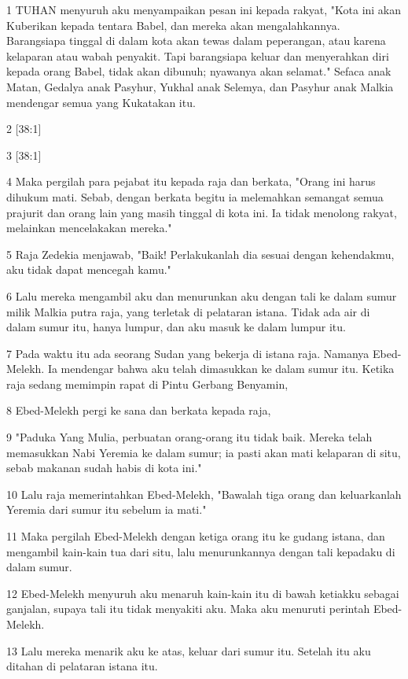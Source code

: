 \par 1 TUHAN menyuruh aku menyampaikan pesan ini kepada rakyat, "Kota ini akan Kuberikan kepada tentara Babel, dan mereka akan mengalahkannya. Barangsiapa tinggal di dalam kota akan tewas dalam peperangan, atau karena kelaparan atau wabah penyakit. Tapi barangsiapa keluar dan menyerahkan diri kepada orang Babel, tidak akan dibunuh; nyawanya akan selamat." Sefaca anak Matan, Gedalya anak Pasyhur, Yukhal anak Selemya, dan Pasyhur anak Malkia mendengar semua yang Kukatakan itu.
\par 2 [38:1]
\par 3 [38:1]
\par 4 Maka pergilah para pejabat itu kepada raja dan berkata, "Orang ini harus dihukum mati. Sebab, dengan berkata begitu ia melemahkan semangat semua prajurit dan orang lain yang masih tinggal di kota ini. Ia tidak menolong rakyat, melainkan mencelakakan mereka."
\par 5 Raja Zedekia menjawab, "Baik! Perlakukanlah dia sesuai dengan kehendakmu, aku tidak dapat mencegah kamu."
\par 6 Lalu mereka mengambil aku dan menurunkan aku dengan tali ke dalam sumur milik Malkia putra raja, yang terletak di pelataran istana. Tidak ada air di dalam sumur itu, hanya lumpur, dan aku masuk ke dalam lumpur itu.
\par 7 Pada waktu itu ada seorang Sudan yang bekerja di istana raja. Namanya Ebed-Melekh. Ia mendengar bahwa aku telah dimasukkan ke dalam sumur itu. Ketika raja sedang memimpin rapat di Pintu Gerbang Benyamin,
\par 8 Ebed-Melekh pergi ke sana dan berkata kepada raja,
\par 9 "Paduka Yang Mulia, perbuatan orang-orang itu tidak baik. Mereka telah memasukkan Nabi Yeremia ke dalam sumur; ia pasti akan mati kelaparan di situ, sebab makanan sudah habis di kota ini."
\par 10 Lalu raja memerintahkan Ebed-Melekh, "Bawalah tiga orang dan keluarkanlah Yeremia dari sumur itu sebelum ia mati."
\par 11 Maka pergilah Ebed-Melekh dengan ketiga orang itu ke gudang istana, dan mengambil kain-kain tua dari situ, lalu menurunkannya dengan tali kepadaku di dalam sumur.
\par 12 Ebed-Melekh menyuruh aku menaruh kain-kain itu di bawah ketiakku sebagai ganjalan, supaya tali itu tidak menyakiti aku. Maka aku menuruti perintah Ebed-Melekh.
\par 13 Lalu mereka menarik aku ke atas, keluar dari sumur itu. Setelah itu aku ditahan di pelataran istana itu.

